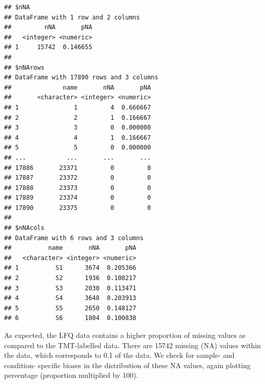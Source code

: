 \documentclass[9pt,a4paper,]{extarticle}
\newenvironment{Shaded}{\begin{snugshade}}{\end{snugshade}}
\newcommand{\AttributeTok}[1]{\textcolor[rgb]{0.13,0.29,0.53}{#1}}
\newcommand{\DecValTok}[1]{\textcolor[rgb]{0.00,0.00,0.81}{#1}}
\newcommand{\DocumentationTok}[1]{\textcolor[rgb]{0.56,0.35,0.01}{\textbf{\textit{#1}}}}
\newcommand{\FunctionTok}[1]{\textcolor[rgb]{0.13,0.29,0.53}{\textbf{#1}}}
\newcommand{\NormalTok}[1]{#1}
\newcommand{\SpecialCharTok}[1]{\textcolor[rgb]{0.81,0.36,0.00}{\textbf{#1}}}
\newcommand{\StringTok}[1]{\textcolor[rgb]{0.31,0.60,0.02}{#1}}
\begin{document}
\begin{verbatim}
## $nNA
## DataFrame with 1 row and 2 columns
##         nNA       pNA
##   <integer> <numeric>
## 1     15742  0.146655
## 
## $nNArows
## DataFrame with 17890 rows and 3 columns
##              name       nNA       pNA
##       <character> <integer> <numeric>
## 1               1         4  0.666667
## 2               2         1  0.166667
## 3               3         0  0.000000
## 4               4         1  0.166667
## 5               5         0  0.000000
## ...           ...       ...       ...
## 17886       23371         0         0
## 17887       23372         0         0
## 17888       23373         0         0
## 17889       23374         0         0
## 17890       23375         0         0
## 
## $nNAcols
## DataFrame with 6 rows and 3 columns
##          name       nNA       pNA
##   <character> <integer> <numeric>
## 1          S1      3674  0.205366
## 2          S2      1936  0.108217
## 3          S3      2030  0.113471
## 4          S4      3648  0.203913
## 5          S5      2650  0.148127
## 6          S6      1804  0.100838
\end{verbatim}

As expected, the LFQ data contains a higher proportion of missing values as
compared to the TMT-labelled data. There are 15742
missing (NA) values within the data, which corresponds to
0.1 of the data.
We check for sample- and condition- specific biases in the distribution of these
NA values, again plotting percentage (proportion multiplied by 100).

\begin{Shaded}
\end{Shaded}
\end{document}
